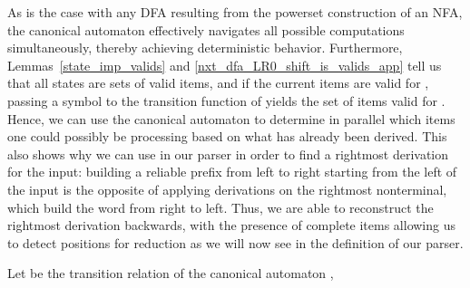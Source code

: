 \begin{isabellebody}
\begin{isamarkuptext}
As is the case with any DFA resulting from the powerset construction of an NFA, the canonical 
 automaton effectively navigates all possible  computations simultaneously,
thereby achieving deterministic behavior. Furthermore, Lemmas~\ref{state_imp_valids} and
\ref{nxt_dfa_LR0_shift_is_valids_app} tell us that all  states are sets of valid items,
and if the current items are valid for \isa{{\isasymgamma}}, passing a symbol  to the transition function of
 yields the set of items valid for . Hence, we can use the canonical 
automaton to determine in
parallel which items one could possibly be processing based on what has already been derived. This
also shows why we can use  in our parser in order to find a rightmost derivation for the
input: building a reliable prefix from left to right starting from the left of the input is the
opposite of applying derivations on the rightmost nonterminal, which build the word from right to
left. Thus, we are able to reconstruct the rightmost derivation backwards, with the presence of
complete items allowing us to detect positions for reduction as we will now see in the definition
of our parser.%
\end{isamarkuptext}\isamarkuptrue%
%
\isadelimdocument
%
\endisadelimdocument
%
\isatagdocument
%
\isamarkuptrue%
%
\endisatagdocument
{\isafolddocument}%
%
\isadelimdocument
%
\endisadelimdocument
%
\isadelimproof
%
\endisadelimproof
%
\isatagproof
%
\endisatagproof
{\isafoldproof}%
%
\isadelimproof
%
\endisadelimproof
%
\isadelimdocument
%
\endisadelimdocument
%
\isatagdocument
%
\isamarkuptrue%
%
\endisatagdocument
{\isafolddocument}%
%
\isadelimdocument
%
\endisadelimdocument
%
\begin{isamarkuptext}%
\begin{definition}
Let  be the transition relation of the canonical  automaton , 

\end{definition}
\end{isamarkuptext}
\end{isabellebody}
